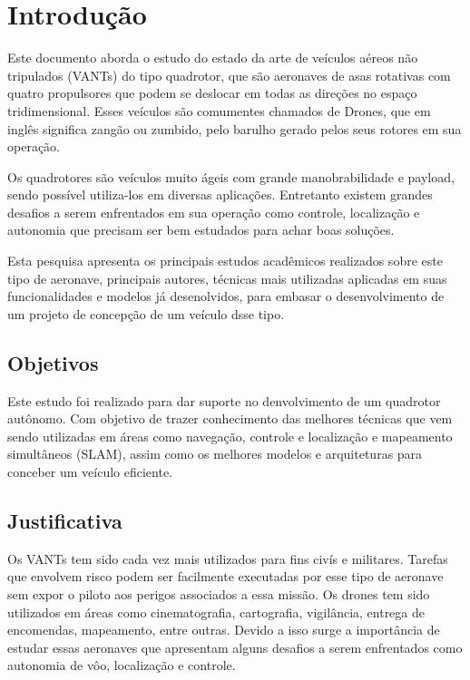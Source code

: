 \chapter{Introdução}
\label{chap:intro}

Este documento aborda o estudo do estado da arte de veículos aéreos não tripulados (VANTs) do tipo quadrotor, que são aeronaves de asas rotativas com quatro propulsores que podem se deslocar em todas as direções no espaço tridimensional. Esses veículos são comumentes chamados de Drones, que em inglês significa zangão ou zumbido, pelo barulho gerado pelos seus rotores em sua operação.

Os quadrotores são veículos muito ágeis com grande manobrabilidade e payload, sendo possível utiliza-los em diversas aplicações. Entretanto existem grandes desafios a serem enfrentados em sua operação como controle, localização e autonomia que precisam ser bem estudados para achar boas soluções.

Esta pesquisa apresenta os principais estudos acadêmicos realizados sobre este tipo de aeronave, principais autores, técnicas mais utilizadas aplicadas em suas funcionalidades e modelos já desenolvidos, para embasar o desenvolvimento de um projeto de concepção de um veículo dsse tipo.

\section{Objetivos}
\label{sec:obj}

Este estudo foi realizado para dar suporte no denvolvimento de um quadrotor autônomo. Com objetivo de trazer conhecimento das melhores técnicas que vem sendo utilizadas em áreas como navegação, controle e localização e mapeamento simultâneos (SLAM), assim como os melhores modelos e arquiteturas para conceber um veículo eficiente.

\section{Justificativa}
\label{sec:justi}

Os VANTs tem sido cada vez mais utilizados para fins civís e militares. Tarefas que envolvem risco podem ser facilmente executadas por esse tipo de aeronave sem expor o piloto aos perigos associados a essa missão. Os drones tem sido utilizados em áreas como cinematografia, cartografia, vigilância, entrega de encomendas, mapeamento, entre outras. Devido a isso surge a importância de estudar essas aeronaves que apresentam alguns desafios a serem enfrentados como autonomia de vôo, localização e controle.

